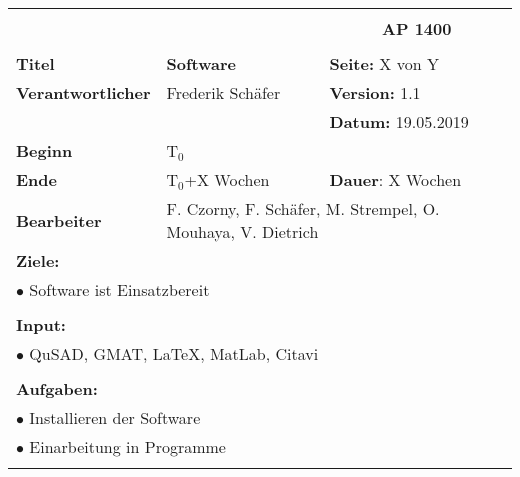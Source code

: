 \clearpage
\begin{table}[!h]
 \begin{center}
  \begin{tabular}{|p{35mm}||p{55mm}|p{50mm}||p{40mm}|}
   \hline
   \multicolumn{3}{|l||}{\textbf{}} & \multicolumn{1}{c|}{}\\
   \multicolumn{3}{|l||}{\textbf{}} & \multicolumn{1}{c|}{\textbf{AP 1400}}\\
   \multicolumn{3}{|l||}{\textbf{}} & \multicolumn{1}{c|}{}\\
   \hline\hline
   \textbf{Titel} & \multicolumn{2}{p{7cm}||}{\textbf{Software}} & \textbf{Seite:} X von Y\\
   \hline
   \textbf{Verantwortlicher} & \multicolumn{2}{l||}{Frederik Schäfer} & \textbf{Version:} 1.1\\
   \hline
   \multicolumn{3}{|l||}{} & \textbf{Datum:} 19.05.2019\\
   \hline\hline
   \textbf{Beginn} & \multicolumn{2}{l||}{T$_0$} & \\
   \hline
   \textbf{Ende} & \multicolumn{2}{l||}{T$_0$+X Wochen} & \textbf{Dauer}: X Wochen\\
   \hline\hline
   \textbf{Bearbeiter} & \multicolumn{3}{l|}{F. Czorny, F. Schäfer, M. Strempel, O. Mouhaya, V. Dietrich}\\
   \hline\hline
   \multicolumn{4}{|p{150mm}|}{\textbf{Ziele:}}\\
   \multicolumn{4}{|p{150mm}|}{$\bullet$ Software ist Einsatzbereit}\\
   \multicolumn{4}{|p{150mm}|}{}\\
   \multicolumn{4}{|p{150mm}|}{\textbf{Input:}}\\
   \multicolumn{4}{|p{150mm}|}{$\bullet$ QuSAD, GMAT, LaTeX, MatLab, Citavi}\\
   \multicolumn{4}{|p{150mm}|}{}\\
   \multicolumn{4}{|p{150mm}|}{\textbf{Aufgaben:}}\\
   \multicolumn{4}{|p{150mm}|}{$\bullet$ Installieren der Software}\\
   \multicolumn{4}{|p{150mm}|}{$\bullet$ Einarbeitung in Programme}\\
   \multicolumn{4}{|p{150mm}|}{}\\
   \hline
  \end{tabular}
 \end{center}
\end{table}

